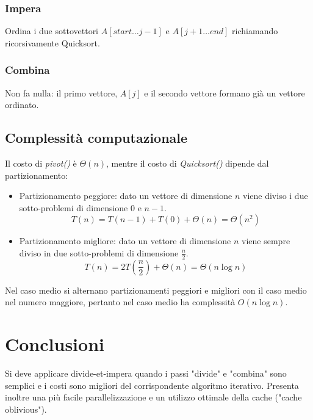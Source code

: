 \subsubsection{Impera}
Ordina i due sottovettori $A[start\dots j-1]$ e $A[j+1\dots end]$ richiamando ricorsivamente Quicksort.
\subsubsection{Combina}
Non fa nulla: il primo vettore, $A[j]$ e il secondo vettore formano gi\`a un vettore ordinato. 
\begin{multicols}{2}

\columnbreak

\end{multicols}
\subsection{Complessit\`a computazionale}
Il costo di \emph{pivot()} \`e $\Theta(n)$, mentre il costo di \emph{Quicksort()} dipende dal partizionamento:
\begin{itemize}
\item Partizionamento peggiore: dato un vettore di dimensione $n$ viene diviso i due sotto-problemi di dimensione $0$ e $n-1$. $$T(n) = T(n-1) + T(0) + 
\Theta(n) = \Theta(n^2)$$
\item Partizionamento migliore: dato un vettore di dimensione $n$ viene sempre diviso in due sotto-problemi di dimensione $\frac{n}{2}$.  $$T(n) = 
2T(\frac{n}{2}) + \Theta(n) = \Theta(n\log n)$$
\end{itemize}
Nel caso medio si alternano partizionamenti peggiori e migliori con il caso medio nel numero maggiore, pertanto nel caso medio ha complessit\`a $O(n\log n)
$.
\section{Conclusioni}
Si deve applicare divide-et-impera quando i passi "divide" e "combina" sono semplici e i costi sono migliori del corrispondente algoritmo iterativo. Presenta inoltre una pi\`u facile parallelizzazione e un utilizzo
ottimale della cache ("cache oblivious"). 